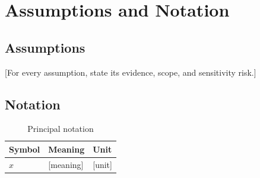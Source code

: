 \section{Assumptions and Notation}
\subsection{Assumptions}
[For every assumption, state its evidence, scope, and sensitivity risk.]
\subsection{Notation}
\begin{table}[H]\centering\caption{Principal notation}\label{tab:notation}
\begin{tabular}{lll}\toprule Symbol & Meaning & Unit\\\midrule $x$ & [meaning] & [unit]\\\bottomrule\end{tabular}
\end{table}
